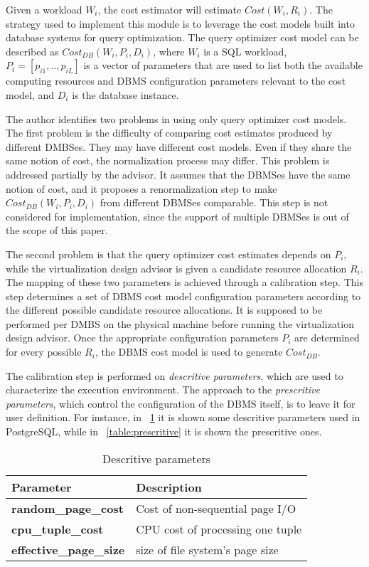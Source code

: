 Given a workload $W_{i}$, the cost estimator will estimate $Cost(W_{i},R_{i})$. The strategy used to implement this module is to leverage the cost models built into database systems for query optimization. The query optimizer cost model can be described as $Cost_{DB}(W_{i},P_{i},D_{i})$, where $W_{i}$ is a SQL workload, $P_{i} = [p_{i1},..,p_{iL}]$ is a vector of parameters that are used to list both the available computing resources and DBMS configuration parameters relevant to the cost model, and $D_{i}$ is  the database instance. 

The author identifies two problems in using only query optimizer cost models. The first problem is the difficulty of comparing cost estimates produced by different DMBSes. They may have different cost models. Even if they share the same notion of cost, the normalization process may differ. This problem is addressed partially by the advisor. It assumes that the DBMSes have the same notion of cost, and it proposes a renormalization step to make $Cost_{DB}(W_{i},P_{i},D_{i})$ from different DBMSes comparable. This step is not considered for implementation, since the support of multiple DBMSes is out of the scope of this paper.

The second problem is that the query optimizer cost estimates depends on $P_{i}$, while the virtualization design advisor is given a candidate resource allocation $R_{i}$. The mapping of these two parameters is achieved through a calibration step. This step determines a set of DBMS cost model configuration parameters according to the different possible candidate resource allocations. It is supposed to be performed per DMBS on the physical machine before running the virtualization design advisor. Once the appropriate configuration parameters $P_{i}$ are determined for every possible $R_{i}$, the DBMS cost model is used to generate $Cost_{DB}$.

The calibration step is performed on  \textit{descritive parameters}, which are used to characterize the execution environment. The approach to the \textit{prescritive parameters}, which control the configuration of the DBMS itself, is to leave it for user definition. For instance, in ~\ref{table:descritive} it is shown some descritive parameters used in PostgreSQL, while in ~\ref{table:prescritive} it is shown the prescritive ones. 


\begin{table}[ht]
    \centering
    \begin{tabular}{ | l | p{5cm} |}
    \hline
    Parameter & Description  \\ \hline
    \textbf{random\_page\_cost} & Cost of non-sequential page I/O \\ \hline
    \textbf{cpu\_tuple\_cost} & CPU cost of processing one tuple \\ \hline
    \textbf{effective\_page\_size} & size of file system's page size  \\
    \hline
    \end{tabular}
    \caption{Descritive parameters}
    \label{table:descritive}
\end{table}


